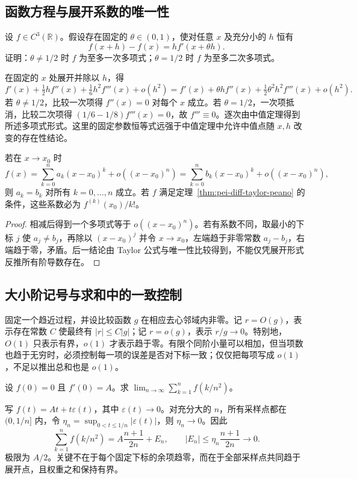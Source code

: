 \subsection{函数方程与展开系数的唯一性}

\begin{example}
\label{ex:pei-diff-fixed-mean-parameter}
设 $f\in C^3(\mathbb R)$。假设存在固定的 $\theta\in(0,1)$，使对任意 $x$ 及充分小的 $h$ 恒有
\[
 f(x+h)-f(x)=h f'(x+\theta h).
\]
证明：$\theta\ne1/2$ 时 $f$ 为至多一次多项式；$\theta=1/2$ 时 $f$ 为至多二次多项式。
\end{example}
\begin{solve}
在固定的 $x$ 处展开并除以 $h$，得
\[
 f'(x)+\tfrac12h f''(x)+\tfrac16h^2f'''(x)+o(h^2)
 =f'(x)+\theta h f''(x)+\tfrac12\theta^2h^2f'''(x)+o(h^2).
\]
若 $\theta\ne1/2$，比较一次项得 $f''(x)=0$ 对每个 $x$ 成立。若 $\theta=1/2$，一次项抵消，比较二次项得 $(1/6-1/8)f'''(x)=0$，故 $f'''\equiv0$。逐次由中值定理得到所述多项式形式。这里的固定参数恒等式远强于中值定理中允许中值点随 $x,h$ 改变的存在性结论。
\end{solve}

\begin{proposition}[有限阶渐近展开的唯一性]
\label{prop:pei-diff-taylor-unique}
若在 $x\to x_0$ 时
\[
 f(x)=\sum_{k=0}^n a_k(x-x_0)^k+o((x-x_0)^n)
     =\sum_{k=0}^n b_k(x-x_0)^k+o((x-x_0)^n),
\]
则 $a_k=b_k$ 对所有 $k=0,\ldots,n$ 成立。若 $f$ 满足定理~\ref{thm:pei-diff-taylor-peano} 的条件，这些系数必为 $f^{(k)}(x_0)/k!$。
\end{proposition}
\begin{proof}
相减后得到一个多项式等于 $o((x-x_0)^n)$。若有系数不同，取最小的下标 $j$ 使 $a_j\ne b_j$，再除以 $(x-x_0)^j$ 并令 $x\to x_0$，左端趋于非零常数 $a_j-b_j$，右端趋于零，矛盾。后一结论由 Taylor 公式与唯一性比较得到，不能仅凭展开形式反推所有阶导数存在。
\end{proof}

\subsection{大小阶记号与求和中的一致控制}

固定一个趋近过程，并设比较函数 $g$ 在相应去心邻域内非零。记 $r=O(g)$，表示存在常数 $C$ 使最终有 $|r|\le C|g|$；记 $r=o(g)$，表示 $r/g\to0$。特别地，$O(1)$ 只表示有界，$o(1)$ 才表示趋于零。有限个同阶小量可以相加，但当项数也趋于无穷时，必须控制每一项的误差是否对下标一致；仅仅把每项写成 $o(1)$，不足以推出总和也是 $o(1)$。

\begin{example}
\label{ex:pei-diff-uniform-small-remainders}
设 $f(0)=0$ 且 $f'(0)=A$。求
$\displaystyle\lim_{n\to\infty}\sum_{k=1}^n f(k/n^2)$。
\end{example}
\begin{solve}
写 $f(t)=At+t\varepsilon(t)$，其中 $\varepsilon(t)\to0$。对充分大的 $n$，所有采样点都在 $(0,1/n]$ 内，令 $\eta_n=\sup_{0<t\le1/n}|\varepsilon(t)|$，则 $\eta_n\to0$。因此
\[
 \sum_{k=1}^n f(k/n^2)
 =A\frac{n+1}{2n}+E_n,
 \qquad |E_n|\le\eta_n\frac{n+1}{2n}\longrightarrow0.
\]
极限为 $A/2$。关键不在于每个固定下标的余项趋零，而在于全部采样点共同趋于展开点，且权重之和保持有界。
\end{solve}

